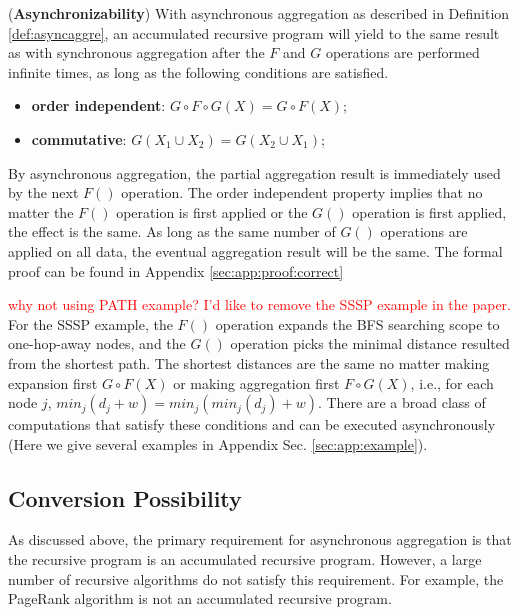 \begin{theorem}
	\label{th:async}
	(\textbf{Asynchronizability}) With asynchronous aggregation as described in Definition \ref{def:asyncaggre}, an accumulated recursive program will yield to the same result as with synchronous aggregation after the $F$ and $G$ operations are performed infinite times, as long as the following conditions are satisfied.
	\begin{itemize}
		\item \textbf{order independent}: $G\circ F\circ G(X)=G\circ F(X)$;
		\item \textbf{commutative}: $G(X_1\cup X_2)=G(X_2\cup X_1)$;
	\end{itemize}
\end{theorem}

By asynchronous aggregation, the partial aggregation result is immediately used by the next $F()$ operation. The order independent property implies that no matter the $F()$ operation is first applied or the $G()$ operation is first applied, the effect is the same. As long as the same number of $G()$ operations are applied on all data, the eventual aggregation result will be the same.%
The formal proof can be found in Appendix \ref{sec:app:proof:correct}


\textcolor{red}{why not using PATH example? I'd like to remove the SSSP example in the paper.} For the SSSP example, the $F()$ operation expands the BFS searching scope to one-hop-away nodes, and the $G()$ operation picks the minimal distance resulted from the shortest path. The shortest distances are the same no matter making expansion first $G\circ F(X)$ or making aggregation first $F\circ G(X)$, i.e., for each node $j$, $min_j(d_j+w)=min_j(min_j(d_j)+w)$. There are a broad class of computations that satisfy these conditions and can be executed asynchronously (Here we give several examples in Appendix Sec. \ref{sec:app:example}).


\subsection{Conversion Possibility}
\label{sec:async:convert}

As discussed above, the primary requirement for asynchronous aggregation is that the recursive program is an accumulated recursive program. However, a large number of recursive algorithms do not satisfy this requirement. For example, the PageRank algorithm is not an accumulated recursive program.

